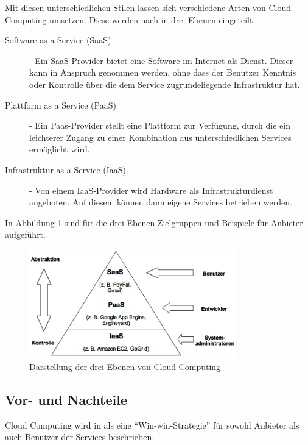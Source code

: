 Mit diesen unterschiedlichen Stilen lassen sich verschiedene Arten von Cloud Computing umsetzen. Diese werden nach \cite{cloud:enzyklopaedie} in drei Ebenen eingeteilt:

\begin{description}
\item[Software as a Service (SaaS)] - Ein SaaS-Provider bietet eine Software im Internet als Dienst. Dieser kann in Anspruch genommen werden, ohne dass der Benutzer Kenntnis oder Kontrolle über die dem Service zugrundeliegende Infrastruktur hat.
\item[Plattform as a Service (PaaS)] - Ein Paas-Provider stellt eine Plattform zur Verfügung, durch die ein leichterer Zugang zu einer Kombination aus unterschiedlichen Services ermöglicht wird.
\item[Infrastruktur as a Service (IaaS)] - Von einem IaaS-Provider wird Hardware als Infrastrukturdienst angeboten. Auf diesem können dann eigene Services betrieben werden.
\end{description}

In Abbildung \ref{fig:aas} sind für die drei Ebenen Zielgruppen und Beispiele für Anbieter aufgeführt.

\medskip
\begin{figure}[ht] 
  \begin{center}
    \includegraphics[width=0.8\textwidth]{grafik/cc-services} 
  \end{center}
  \caption{Darstellung der drei Ebenen von Cloud Computing}
  \label{fig:aas}
\end{figure}



\subsection{Vor- und Nachteile}

Cloud Computing wird in  als eine \enquote{Win-win-Strategie} für sowohl Anbieter als auch Benutzer der Services beschrieben.

